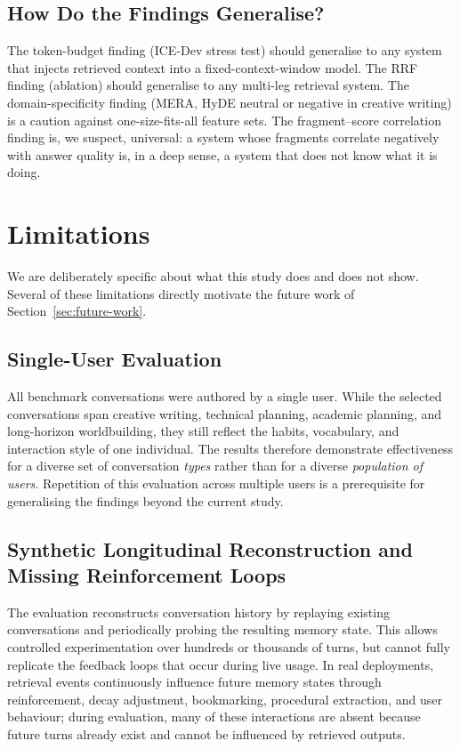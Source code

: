 \documentclass[11pt,a4paper]{article}
\begin{document}
\subsection{How Do the Findings Generalise?}

The token-budget finding (ICE-Dev stress test) should generalise to any system that injects retrieved context into a fixed-context-window model. The RRF finding (ablation) should generalise to any multi-leg retrieval system. The domain-specificity finding (MERA, HyDE neutral or negative in creative writing) is a caution against one-size-fits-all feature sets. The fragment--score correlation finding is, we suspect, universal: a system whose fragments correlate negatively with answer quality is, in a deep sense, a system that does not know what it is doing.

\section{Limitations}
\label{sec:limitations}

We are deliberately specific about what this study does and does not show. Several of these limitations directly motivate the future work of Section~\ref{sec:future-work}.

\subsection{Single-User Evaluation}
All benchmark conversations were authored by a single user. While the selected conversations span creative writing, technical planning, academic planning, and long-horizon worldbuilding, they still reflect the habits, vocabulary, and interaction style of one individual. The results therefore demonstrate effectiveness for a diverse set of conversation \emph{types} rather than for a diverse \emph{population of users}. Repetition of this evaluation across multiple users is a prerequisite for generalising the findings beyond the current study.

\subsection{Synthetic Longitudinal Reconstruction and Missing Reinforcement Loops}
The evaluation reconstructs conversation history by replaying existing conversations and periodically probing the resulting memory state. This allows controlled experimentation over hundreds or thousands of turns, but cannot fully replicate the feedback loops that occur during live usage. In real deployments, retrieval events continuously influence future memory states through reinforcement, decay adjustment, bookmarking, procedural extraction, and user behaviour; during evaluation, many of these interactions are absent because future turns already exist and cannot be influenced by retrieved outputs.
\end{document}
